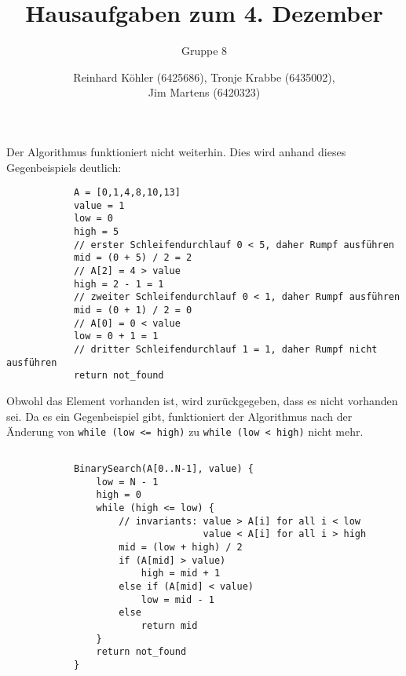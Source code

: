 \documentclass[10pt,a4paper,oneside,ngerman,numbers=noenddot]{scrartcl}
\begin{document}
\author{Reinhard Köhler (6425686), Tronje Krabbe (6435002), \\
Jim Martens (6420323)}
\title{Hausaufgaben zum 4. Dezember}
\subtitle{Gruppe 8}
\maketitle
\section{} %
	\subsection{} %
		Der Algorithmus funktioniert nicht weiterhin. Dies wird anhand dieses Gegenbeispiels deutlich:
		
		\begin{verbatim}
		    A = [0,1,4,8,10,13]
		    value = 1
		    low = 0
		    high = 5
		    // erster Schleifendurchlauf 0 < 5, daher Rumpf ausführen
		    mid = (0 + 5) / 2 = 2
		    // A[2] = 4 > value
		    high = 2 - 1 = 1
		    // zweiter Schleifendurchlauf 0 < 1, daher Rumpf ausführen
		    mid = (0 + 1) / 2 = 0
		    // A[0] = 0 < value
		    low = 0 + 1 = 1
		    // dritter Schleifendurchlauf 1 = 1, daher Rumpf nicht ausführen
		    return not_found
		\end{verbatim}
		
		Obwohl das Element vorhanden ist, wird zurückgegeben, dass es nicht vorhanden sei. Da es ein Gegenbeispiel gibt, funktioniert der Algorithmus nach der Änderung von \texttt{while (low <= high)} zu \texttt{while (low < high)} nicht mehr.
	\subsection{} %
		\begin{verbatim}
		    BinarySearch(A[0..N-1], value) {
		        low = N - 1
		        high = 0
		        while (high <= low) {
		            // invariants: value > A[i] for all i < low
		                           value < A[i] for all i > high
		            mid = (low + high) / 2
		            if (A[mid] > value)
		                high = mid + 1
		            else if (A[mid] < value)
		                low = mid - 1
		            else
		                return mid
		        }
		        return not_found
		    }
		\end{verbatim}
\end{document}
